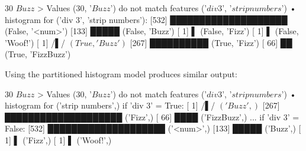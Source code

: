 \begin{lstnobreak}[gobble=2]
   $30$ $Buzz$
   > Values ($30$, '$Buzz$') do not
     match features ('$div 3$', '$strip numbers$')
   • histogram for ('div 3', 'strip numbers'):
     [532] ████████████████████ (False, '<num>')
     [133] █████ (False, 'Buzz')
     [  1] ▌ (False, 'Fizz')
     [  1] ▌ (False, 'Woof!')
     [  1] /▌/ $(True, 'Buzz')$
     [267] ██████████ (True, 'Fizz')
     [ 66] ██ (True, 'FizzBuzz')
\end{lstnobreak}

Using the partitioned histogram model produces similar output:

\begin{lstnobreak}[gobble=2]
   $30$ $Buzz$
   > Values ($30$, '$Buzz$') do not
     match features ('$div 3$', '$strip numbers$')
   • histogram for ('strip numbers',) if 'div 3' = True:
     [  1] /▌/ $('Buzz',)$
     [267] ████████████████████ ('Fizz',)
     [ 66] ████ ('FizzBuzz',)
   ... if 'div 3' = False:
     [532] ████████████████████ ('<num>',)
     [133] █████ ('Buzz',)
     [  1] ▌ ('Fizz',)
     [  1] ▌ ('Woof!',)
\end{lstnobreak}
